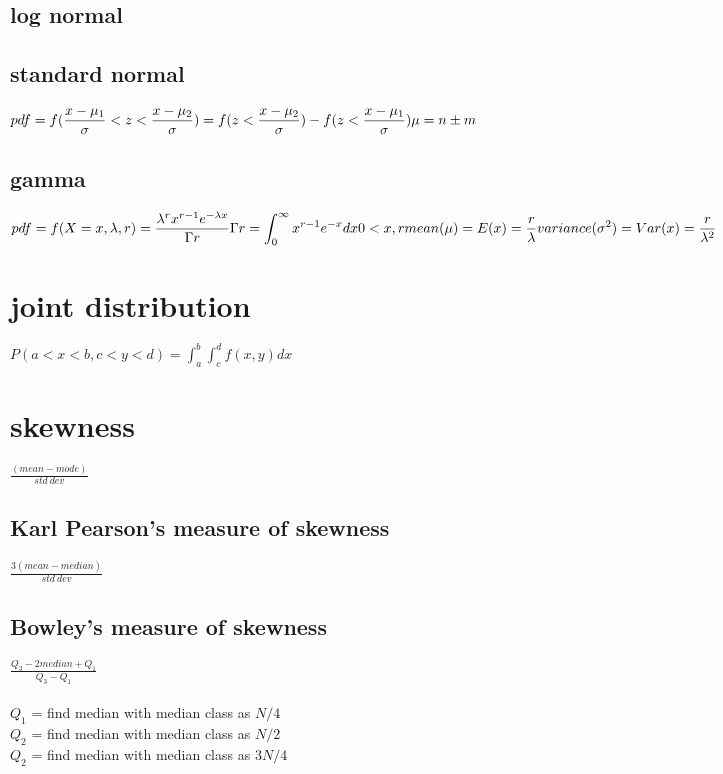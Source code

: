 \documentclass[12pt]{article}
\begin{document}
\subsection{log normal}
\subsection{standard normal}
$\displaystyle
pdf = f(\frac{x-\mu_1}{\sigma} < z < \frac{x-\mu_2}{\sigma}) = f(z < \frac{x-\mu_2}{\sigma}) - f(z < \frac{x-\mu_1}{\sigma})\\ \\
\mu = n \pm m
$

\subsection{gamma}
$\displaystyle
pdf = f(X=x, \lambda, r) = \frac{\lambda^r x^{r-1} e ^{-\lambda x}}{\Gamma r} \\
\Gamma r = \int_{0}^{\infty}{x^{r-1}e^{-x}dx} \\
0 < x,r \\ \\ \\
mean (\mu) = E(x) = \frac{r}{\lambda} \\
variance (\sigma^2) = Var(x) = \frac{r}{\lambda^2} \\
$

\section{joint distribution}
$\displaystyle P(a<x<b, c<y<d) = \int_a^b{\int_c^d{f(x,y) dx}}$

\section{skewness}
$\displaystyle \frac{(mean - mode)}{std\ dev}$
\subsection{Karl Pearson's measure of skewness}
$\displaystyle \frac{3(mean - median)}{std\ dev}$

\subsection{Bowley's measure of skewness}
$\displaystyle \frac{Q_3 - 2 median + Q_1}{Q_3 - Q_1}$ \\ \\
$Q_1$ = find median with median class as $N/4$ \\
$Q_2$ = find median with median class as $N/2$ \\
$Q_2$ = find median with median class as $3N/4$
\end{document}
